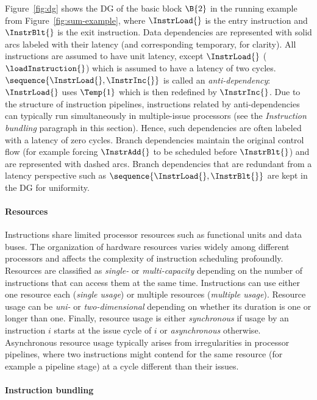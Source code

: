 \documentclass[acmsmall,authorversion,nonacm]{acmart}
\begin{document}
Figure~\ref{fig:dg} shows the DG of the basic block $\B{2}$ in the
running example from Figure~\ref{fig:sum-example}, where
$\InstrLoad{}$ is the entry instruction and $\InstrBlt{}$ is the exit
instruction.
Data dependencies are represented with solid arcs labeled with their
latency (and corresponding temporary, for clarity).
All instructions are assumed to have unit latency, except
$\InstrLoad{}$ ($\loadInstruction{}$) which is assumed to have a
latency of two cycles.
$\sequence{\InstrLoad{},\InstrInc{}}$ is called an
\emph{anti-dependency}: $\InstrLoad{}$ uses $\Temp{1}$ which is then
redefined by $\InstrInc{}$.
Due to the structure of instruction pipelines, instructions related by
anti-dependencies can typically run simultaneously in multiple-issue
processors (see the \emph{Instruction bundling} paragraph in this
section).
Hence, such dependencies are often labeled with a latency of zero
cycles.
Branch dependencies maintain the original control flow (for example
forcing $\InstrAdd{}$ to be scheduled before $\InstrBlt{}$) and are
represented with dashed arcs.
Branch dependencies that are redundant from a latency perspective such
as $\sequence{\InstrLoad{},\InstrBlt{}}$ are kept in the DG for
uniformity.

\paragraph{Resources}

Instructions share limited processor resources such as functional
units and data buses.
The organization of hardware resources varies widely among different
processors and affects the complexity of instruction scheduling
profoundly.
Resources are classified as \emph{single-} or \emph{multi-capacity}
depending on the number of instructions that can access them at the same
time.
Instructions can use either one resource each (\emph{single usage}) or
multiple resources (\emph{multiple usage}).
Resource usage can be \emph{uni-} or \emph{two-dimensional} depending on
whether its duration is one or longer than one.
Finally, resource usage is either \emph{synchronous} if usage by an
instruction $i$ starts at the issue cycle of $i$ or \emph{asynchronous}
otherwise.
Asynchronous resource usage typically arises from irregularities in
processor pipelines, where two instructions might contend for the same
resource (for example a pipeline stage) at a cycle different than
their issues.

\paragraph{Instruction bundling}
\end{document}

